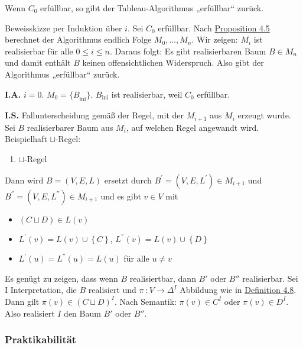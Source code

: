 Wenn $C_{0}$ erfüllbar, so gibt der Tableau-Algorithmus „erfüllbar``
zurück.

Beweisskizze per Induktion über $i$. Sei $C_{0}$ erfüllbar. Nach
\protect\hyperlink{proposition-4.5-terminierung}{Proposition 4.5}
berechnet der Algorithmus endlich Folge $M_{0},\ldots,M_{n}$. Wir
zeigen: $M_{i}$ ist realisierbar für alle $0 \leq i \leq n$. Daraus
folgt: Es gibt realisierbaren Baum $B \in M_{n}$ und damit enthält
$B$ keinen offensichtlichen Widerspruch. Also gibt der Algorithmus
„erfüllbar`` zurück.

\textbf{I.A.} $i = 0$. $M_{0} = {\{ B}_{\text{ini}}\}$.
$B_{\text{ini}}$ ist realisierbar, weil $C_{0}$ erfüllbar.

\textbf{I.S.} Fallunterscheidung gemäß der Regel, mit der $M_{i + 1}$
aus $M_{i}$ erzeugt wurde. Sei $B$ realisierbarer Baum aus
$M_{i}$, auf welchen Regel angewandt wird. Beispielhaft
$\sqcup$-Regel:

\begin{enumerate}
\def\labelenumi{\arabic{enumi}.}
\item
  $\sqcup$-Regel
\end{enumerate}

Dann wird $B = \left( V,E,L \right)$ ersetzt durch
$B^{'} = \left( V,E,L^{'} \right) \in M_{i + 1}$ und
$B^{''} = \left( V,E,L^{''} \right) \in M_{i + 1}$ und es gibt
$v \in V$ mit

\begin{itemize}
\item
  $\left( C \sqcup D \right) \in L(v)$
\item
  $L^{'}\left( v \right) = L\left( v \right) \cup \left\{ C \right\}$,
  $L^{''}\left( v \right) = L\left( v \right) \cup \left\{ D \right\}$
\item
  $L^{'}\left( u \right) = L^{''}\left( u \right) = L\left( u \right)$
  für alle $u \neq v$
\end{itemize}

Es genügt zu zeigen, dass wenn $B$ realisiertbar, dann $B'$ oder
$B''$ realisierbar. Sei $\text{I\ }$Interpretation, die $B$
realisiert und $\pi\ :V \rightarrow \Delta^{I}$ Abbildung wie in
\protect\hyperlink{realisierbarkeit}{Definition 4.8}. Dann gilt
$\pi\left( v \right) \in \left( C \sqcup D \right)^{I}$. Nach
Semantik: $\pi\left( v \right) \in C^{I}$ oder
$\pi\left( v \right) \in D^{I}$. Also realisiert $I$ den Baum $B'$
oder $B''$.

\subsubsection{Praktikabilität}\label{praktikabilituxe4t}

